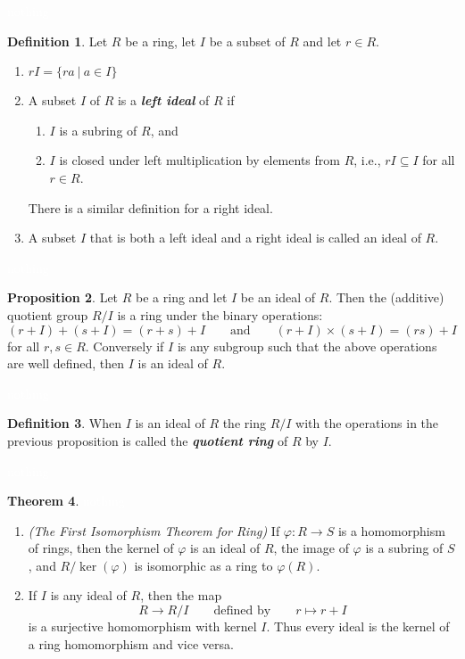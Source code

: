 \documentclass{article}
\theoremstyle{definition}
\newtheorem{thm}{Theorem}[section]
\newtheorem{prop}[thm]{Proposition}
\newtheorem{defn}[thm]{Definition}
\newcommand{\nl}{\textcolor{white}{nothing}}
\newcommand{\ra}{\rightarrow}
\newcommand{\seq}{\subseteq}
\newcommand{\vphi}{\varphi}
\begin{document}
\nl

\begin{defn}
Let $R$ be a ring, let $I$ be a subset of $R$ and let $r\in R$.
\begin{enumerate}
\item $rI = \{ra\ |\ a\in I\}$
\item A subset $I$ of $R$ is a \textit{\textbf{left ideal}} of $R$ if 
\begin{enumerate}
\item $I$ is a subring of $R$, and
\item $I$ is closed under left multiplication by elements from $R$, i.e., $rI\seq I$ for all $r\in R$.
\end{enumerate}
There is a similar definition for a right ideal.
\item A subset $I$ that is both a left ideal and a right ideal is called an ideal of $R$.
\end{enumerate}
\end{defn}

\nl

\begin{prop}
Let $R$ be a ring and let $I$ be an ideal of $R$. Then the (additive) quotient group $R/I$ is a ring under the binary operations:
\[(r+I)+(s+I) = (r+s)+I\qquad\text{and}\qquad(r+I)\times(s+I)=(rs)+I\]
for all $r,s\in R$. Conversely if $I$ is any subgroup such that the above operations are well defined, then $I$ is an ideal of $R$.
\end{prop}

\nl

\begin{defn}
When $I$ is an ideal of $R$ the ring $R/I$ with the operations in the previous proposition is called the \textit{\textbf{quotient ring}} of $R$ by $I$.
\end{defn}

\nl

\begin{thm}\nl
\begin{enumerate}
\item \textit{(The First Isomorphism Theorem for Ring)} If $\vphi:R\ra S$ is a homomorphism of rings, then the kernel of $\vphi$ is an ideal of $R$, the image of $\vphi$ is a subring of $S$, and $R/\ker(\vphi)$ is isomorphic as a ring to $\vphi(R)$.
\item If $I$ is any ideal of $R$, then the map 
\[R\ra R/I\qquad\text{defined by}\qquad r\mapsto r+I\]
is a surjective homomorphism with kernel $I$. Thus every ideal is the kernel of a ring homomorphism and vice versa.
\end{enumerate}
\end{thm}
\end{document}
